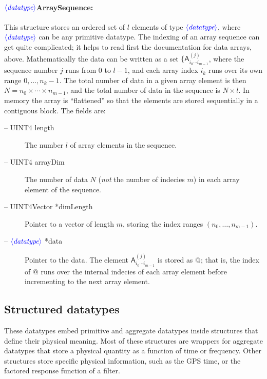 \documentclass[10pt]{ligodcc}
\renewcommand{\texttt}[1]{{\ttfamily\color{blue}#1}}
\newcommand{\opt}[1]{\ensuremath{\color{blue}\langle\textit{#1}\rangle}}
\begin{document}
\paragraph{\opt{datatype}\texttt{ArraySequence}:}
This structure stores an ordered set of $l$ elements of type
\opt{datatype}\verb@Array@, where \opt{datatype} can be any primitive
datatype.  The indexing of an array sequence can get quite
complicated; it helps to read first the documentation for data arrays,
above.  Mathematically the data can be written as a set
$\{\mathsf{A}^{(j)}_{i_0\cdots i_{m-1}}$, where the sequence number
$j$ runs from 0 to $l-1$, and each array index $i_k$ runs over its own
range $0,\ldots,n_k-1$.  The total number of data in a given array
element is then $N=n_0\times\cdots\times n_{m-1}$, and the total
number of data in the sequence is $N\times l$.  In memory the array is
``flattened'' so that the elements are stored sequentially in a
contiguous block.  The fields are:
\begin{description}
\item[-- \texttt{UINT4 length}] The number $l$ of array elements in the
sequence.
\item[-- \texttt{UINT4 arrayDim}] The number of data $N$ (\emph{not} the
number of indecies $m$) in each array element of the sequence.
\item[-- \texttt{UINT4Vector *dimLength}] Pointer to a vector of length
$m$, storing the index ranges $(n_0,\ldots,n_{m-1})$.
\item[-- \opt{datatype} \texttt{*data}] Pointer to the data.  The element
$\mathsf{A}^{(j)}_{i_0\cdots i_{m-1}}$ is stored as
@; that is,
the index of \verb@data[]@ runs over the internal indecies of each
array element before incrementing to the next array element.
\end{description}

\subsection{Structured datatypes}
\label{ss:structured-datatypes}

These datatypes embed primitive and aggregate datatypes inside
structures that define their physical meaning.  Most of these
structures are wrappers for aggregate datatypes that store a physical
quantity as a function of time or frequency.  Other structures store
specific physical information, such as the GPS time, or the factored
response function of a filter.
\end{document}
